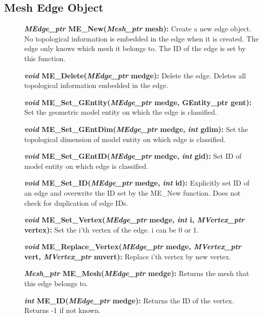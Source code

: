 \documentclass[12pt]{article}
\begin{document}
\newpage
\subsection{Mesh Edge Object}

\begin{description}
\item[]\textbf{\textit{MEdge\_ptr} ME\_New(\textit{Mesh\_ptr} mesh):} Create
a new edge object. No topological information is embedded in the edge
when it is created. The edge only knows which mesh it belongs
to. The ID of the edge is set by this function.

\item[]\textbf{\textit{void} ME\_Delete(\textit{MEdge\_ptr} medge):} Delete
the edge. Deletes all topological information embedded in the edge.

\item[]\textbf{\textit{void} ME\_Set\_GEntity(\textit{MEdge\_ptr} medge,
GEntity\_ptr gent):} Set the geometric model entity on which the edge
is classified.

\item[]\textbf{\textit{void} ME\_Set\_GEntDim(\textit{MEdge\_ptr} medge,
\textit{int} gdim):} Set the topological dimension of model entity on
which edge is classified.

\item[]\textbf{\textit{void} ME\_Set\_GEntID(\textit{MEdge\_ptr} medge,
\textit{int} gid):} Set ID of model entity on which edge is classified.

\item[]\textbf{\textit{void} ME\_Set\_ID(\textit{MEdge\_ptr} medge,
\textit{int} id):} Explicitly set ID of an edge and overwrite the ID set
by the ME\_New function. Does not check for duplication of edge IDs.

\item[]\textbf{\textit{void} ME\_Set\_Vertex(\textit{MEdge\_ptr} medge,
\textit{int} i, \textit{MVertex\_ptr} vertex):} Set the i'th vertex of
the edge. i can be 0 or 1.

\item[]\textbf{\textit{void} ME\_Replace\_Vertex(\textit{MEdge\_ptr} medge,
\textit{MVertex\_ptr} vert, \textit{MVertex\_ptr} nuvert):} Replace
i'th vertex by new vertex.

\item[]\textbf{\textit{Mesh\_ptr} ME\_Mesh(\textit{MEdge\_ptr} medge):}
Returns the mesh that this edge belongs to.

\item[]\textbf{\textit{int} ME\_ID(\textit{MEdge\_ptr} medge):} Returns the
ID of the vertex. Returns -1 if not known.


\end{description}
\end{document}
